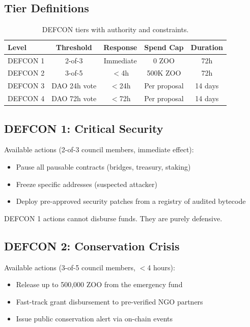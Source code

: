 \documentclass[11pt,letterpaper]{article}
\begin{document}
\subsection{Tier Definitions}

\begin{table}[h]
\centering
\caption{DEFCON tiers with authority and constraints.}
\label{tab:defcon}
\begin{tabular}{lcccc}
\toprule
\textbf{Level} & \textbf{Threshold} & \textbf{Response} & \textbf{Spend Cap} & \textbf{Duration} \\
\midrule
DEFCON 1 & 2-of-3 & Immediate & 0 ZOO & 72h \\
DEFCON 2 & 3-of-5 & $<$4h & 500K ZOO & 72h \\
DEFCON 3 & DAO 24h vote & $<$24h & Per proposal & 14 days \\
DEFCON 4 & DAO 72h vote & $<$72h & Per proposal & 14 days \\
\bottomrule
\end{tabular}
\end{table}

\subsection{DEFCON 1: Critical Security}

Available actions (2-of-3 council members, immediate effect):
\begin{itemize}
    \item Pause all pausable contracts (bridges, treasury, staking)
    \item Freeze specific addresses (suspected attacker)
    \item Deploy pre-approved security patches from a registry of audited bytecode
\end{itemize}

DEFCON 1 actions cannot disburse funds. They are purely defensive.

\subsection{DEFCON 2: Conservation Crisis}

Available actions (3-of-5 council members, $<$4 hours):
\begin{itemize}
    \item Release up to 500{,}000 ZOO from the emergency fund
    \item Fast-track grant disbursement to pre-verified NGO partners
    \item Issue public conservation alert via on-chain events
\end{itemize}
\end{document}
